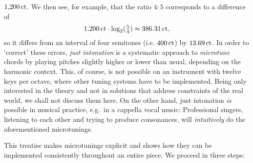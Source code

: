 \documentclass[british,11pt]{scrartcl}
\begin{document}
$1{,}200\,\mathrm{ct}$. We then see, for example, that the ratio $4:5$ corresponds
to a difference of
\[1{,}200\,\mathrm{ct}\cdot \log_2(\tfrac54) \approx 386.31\,\mathrm{ct},\]%
so it differs from an interval of four semitones (i.e. $400\,\mathrm{ct}$) by
$13.69\,\mathrm{ct}$. In order to ‘correct’ these errors, \emph{just intonation} is
a systematic approach to \emph{microtune} chords by playing pitches slightly
higher or lower than usual, depending on the harmonic context. This, of course,
is not possible on an instrument with twelve keys per octave, where other tuning
systems have to be implemented.  Being only interested in the theory and not in
solutions that address constraints of the real world, we shall not discuss them
here.  On the other hand, just intonation \emph{is} possible in musical
practice, e.g.\ in a cappella vocal music: Professional singers, listening to
each other and trying to produce consonances, will \emph{intuitively} do the
aforementioned microtunings.

This treatise makes microtunings explicit and shows how they can be implemented
consistently throughout an entire piece. We proceed in three steps:
\end{document}
